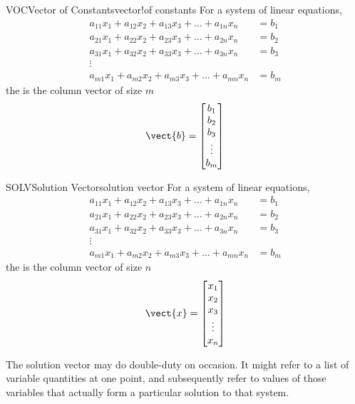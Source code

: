 \begin{definition}{VOC}{Vector of Constants}{vector!of constants}
For a system of linear equations, 
\begin{align*}
a_{11}x_1+a_{12}x_2+a_{13}x_3+\dots+a_{1n}x_n&=b_1\\
a_{21}x_1+a_{22}x_2+a_{23}x_3+\dots+a_{2n}x_n&=b_2\\
a_{31}x_1+a_{32}x_2+a_{33}x_3+\dots+a_{3n}x_n&=b_3\\
\vdots&\\
a_{m1}x_1+a_{m2}x_2+a_{m3}x_3+\dots+a_{mn}x_n&=b_m
\end{align*}
the  is the column vector of size $m$ 
\begin{equation*}
\vect{b}=
\begin{bmatrix}
b_1\\
b_2\\
b_3\\
\vdots\\
b_m\\
\end{bmatrix}
\end{equation*}
\end{definition}
%
\begin{definition}{SOLV}{Solution Vector}{solution vector}
For a system of linear equations, 
\begin{align*}
a_{11}x_1+a_{12}x_2+a_{13}x_3+\dots+a_{1n}x_n&=b_1\\
a_{21}x_1+a_{22}x_2+a_{23}x_3+\dots+a_{2n}x_n&=b_2\\
a_{31}x_1+a_{32}x_2+a_{33}x_3+\dots+a_{3n}x_n&=b_3\\
\vdots&\\
a_{m1}x_1+a_{m2}x_2+a_{m3}x_3+\dots+a_{mn}x_n&=b_m
\end{align*}
the  is the column vector of size $n$
\begin{equation*}
\vect{x}=
\begin{bmatrix}
x_1\\
x_2\\
x_3\\
\vdots\\
x_n\\
\end{bmatrix}
\end{equation*}
\end{definition}
%
The solution vector may do double-duty on occasion.  It might refer to a list of variable quantities at one point, and subsequently refer to values of those variables that actually form a particular solution to that system.

